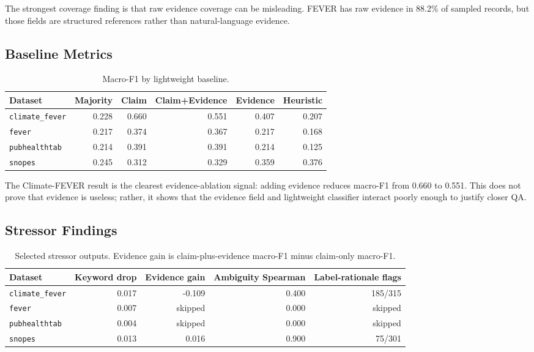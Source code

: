 \documentclass[11pt]{article}
\begin{document}
The strongest coverage finding is that raw evidence coverage can be misleading.
FEVER has raw evidence in 88.2\% of sampled records, but those fields are
structured references rather than natural-language evidence.

\subsection{Baseline Metrics}

\begin{table}[h]
\centering
\small
\begin{tabular}{lrrrrr}
\toprule
Dataset & Majority & Claim & Claim+Evidence & Evidence & Heuristic \\
\midrule
\texttt{climate\_fever} & 0.228 & 0.660 & 0.551 & 0.407 & 0.207 \\
\texttt{fever} & 0.217 & 0.374 & 0.367 & 0.217 & 0.168 \\
\texttt{pubhealthtab} & 0.214 & 0.391 & 0.391 & 0.214 & 0.125 \\
\texttt{snopes} & 0.245 & 0.312 & 0.329 & 0.359 & 0.376 \\
\bottomrule
\end{tabular}
\caption{Macro-F1 by lightweight baseline.}
\label{tab:baselines}
\end{table}

The Climate-FEVER result is the clearest evidence-ablation signal: adding
evidence reduces macro-F1 from 0.660 to 0.551. This does not prove that evidence
is useless; rather, it shows that the evidence field and lightweight classifier
interact poorly enough to justify closer QA.

\subsection{Stressor Findings}

\begin{table}[h]
\centering
\small
\begin{tabular}{lrrrr}
\toprule
Dataset & Keyword drop & Evidence gain & Ambiguity Spearman & Label-rationale flags \\
\midrule
\texttt{climate\_fever} & 0.017 & -0.109 & 0.400 & 185/315 \\
\texttt{fever} & 0.007 & skipped & 0.000 & skipped \\
\texttt{pubhealthtab} & 0.004 & skipped & 0.000 & skipped \\
\texttt{snopes} & 0.013 & 0.016 & 0.900 & 75/301 \\
\bottomrule
\end{tabular}
\caption{Selected stressor outputs. Evidence gain is claim-plus-evidence macro-F1 minus claim-only macro-F1.}
\label{tab:stressors}
\end{table}
\end{document}
